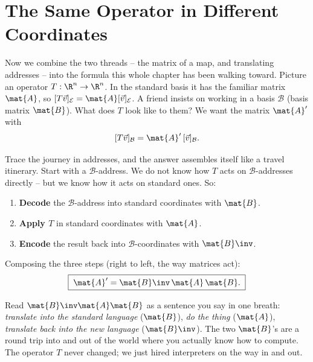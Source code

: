 \section{The Same Operator in Different Coordinates}
\label{ch31:same-operator}

Now we combine the two threads -- the matrix of a map, and translating addresses
-- into the formula this whole chapter has been walking toward. Picture an
operator $T:\R^n\to\R^n$. In the standard basis it has the familiar matrix
$\mat{A}$, so $[T\vec{v}]_{\mathcal{E}}=\mat{A}[\vec{v}]_{\mathcal{E}}$. A friend
insists on working in a basis $\mathcal{B}$ (basis matrix $\mat{B}$). What does
$T$ look like to them? We want the matrix $\mat{A}'$ with
\[
  [T\vec{v}]_{\mathcal{B}} = \mat{A}'\,[\vec{v}]_{\mathcal{B}}.
\]

Trace the journey in addresses, and the answer assembles itself like a
travel itinerary. Start with a $\mathcal{B}$-address. We do not know how $T$ acts
on $\mathcal{B}$-addresses directly -- but we know how it acts on standard ones.
So:
\begin{enumerate}
  \item \textbf{Decode} the $\mathcal{B}$-address into standard coordinates with
        $\mat{B}$.
  \item \textbf{Apply $T$} in standard coordinates with $\mat{A}$.
  \item \textbf{Encode} the result back into $\mathcal{B}$-coordinates with
        $\mat{B}\inv$.
\end{enumerate}
Composing the three steps (right to left, the way matrices act):
\[
  \boxed{\;\mat{A}' = \mat{B}\inv\,\mat{A}\,\mat{B}.\;}
\]

\begin{intuitionbox}
Read $\mat{B}\inv\mat{A}\mat{B}$ as a sentence you say in one breath:
\emph{translate into the standard language} ($\mat{B}$), \emph{do the thing}
($\mat{A}$), \emph{translate back into the new language} ($\mat{B}\inv$). The two
$\mat{B}$'s are a round trip into and out of the world where you actually know how
to compute. The operator $T$ never changed; we just hired interpreters on the way
in and out.
\end{intuitionbox}

